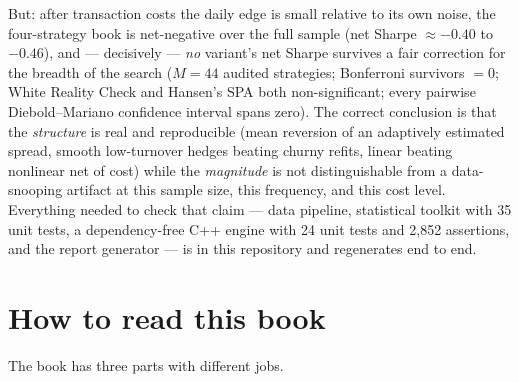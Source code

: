 But: after transaction costs the daily edge is small relative to its own noise, the
four-strategy book is net-negative over the full sample (net Sharpe
$\approx -0.40$ to $-0.46$), and --- decisively --- \emph{no} variant's net Sharpe
survives a fair correction for the breadth of the search
($M=44$ audited strategies; Bonferroni survivors $=0$; White Reality Check and
Hansen's SPA both non-significant; every pairwise Diebold--Mariano confidence interval
spans zero). The correct conclusion is that the \emph{structure} is real and
reproducible (mean reversion of an adaptively estimated spread, smooth low-turnover
hedges beating churny refits, linear beating nonlinear net of cost) while the
\emph{magnitude} is not distinguishable from a data-snooping artifact at this sample
size, this frequency, and this cost level. Everything needed to check that claim ---
data pipeline, statistical toolkit with 35 unit tests, a dependency-free C++ engine
with 24 unit tests and 2{,}852 assertions, and the report generator --- is in this
repository and regenerates end to end.

\vspace{1.5em}

\section*{How to read this book}
\label{sec:howtoread}

The book has three parts with different jobs.

